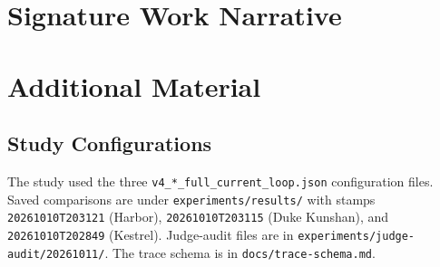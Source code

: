 \documentclass[12pt, a4paper, oneside]{report}
\newcommand{\instructions}[1]{}
\newcommand{\authornote}[1]{}
\begin{document}
\instructions{Many bibliographic styles are acceptable for publications in the natural sciences. This template uses a numeric style defined in biblatex and that is common in Physics, Mathematics, and Computer Science papers.}

\printbibliography[heading=none]



\chapter*{Signature Work Narrative}
\label{narrative}

\authornote{Author to write, 1000--2000 words per the Fall 2026 submission
guideline. The narrative is the author's own account of the two-year
project: the three thematic courses and how they fed the question, the
experiential learning, what the author designed and decided personally,
what changed along the way, and what was learned. Any sentence that states
a finding waits for \#101.}



\appendix

\chapter{Additional Material}
\label{appendix-a}


\instructions{If you have an Overleaf account (either free or paid) you can use this file to start a new Overleaf project.

If you do not want an Overleaf account you can install TeX on your computer and use the template files provided by the Office of Signature Work.}

\section{Study Configurations}

{\raggedright
The study used the three \texttt{v4\_*\_full\_current\_loop.json}
configuration files. Saved comparisons are under
\texttt{experiments/results/} with stamps \texttt{20261010T203121}
(Harbor), \texttt{20261010T203115} (Duke Kunshan), and
\texttt{20261010T202849} (Kestrel). Judge-audit files are in
\texttt{experiments/judge-audit/20261011/}. The trace schema is in
\texttt{docs/trace-schema.md}.\par}
\end{document}

